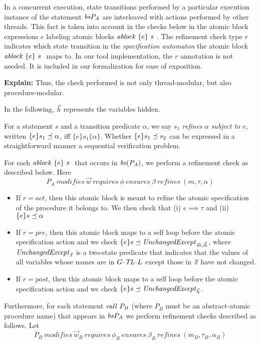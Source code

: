 
In a concurrent execution, state transitions performed by a particular execution instance of the statement $\mathit{bs}{P_{A}}$ are interleaved with actions performed by other threads. This fact is taken into account in the checks below in the atomic block expressions $e$ labeling atomic blocks $\mathit{ablock}\ {\{e\}}\ {s}\ $. The refinement check type $r$ indicates which state transition in the {\em specification automaton} the atomic block $\mathit{ablock}\ {\{e\}}\ {s}\ $ maps to. In our tool implementation, the $r$ annotation is not needed. It is included in our formalization for ease of exposition. 


{\bf Explain:} Thus, the check performed is not only thread-modular, but also procedure-modular. 

In the following, $\vec{h}$ represents the variables hidden.

For a statement $s$ and a transition predicate $\alpha$, we say $s_1$ {\em refines} $\alpha$
{\em subject to $e$}, written $\{ {e} \} {s_1} \preceq {\alpha}$, iff $\{ e \} s_1 \{ \alpha \}$.
Whether $\{ {e} \} {s_1} \preceq {s_2}$ can be
expressed in a straightforward manner a sequential verification
problem.



For each $\mathit{ablock}\ {\{e\}}\ {s}\ $ that occurs in $\mathit{bs}(P_{A})$, we perform a refinement check as described below. Here 
$$P_{A}\ \mathit{modifies}\
\vec{w}\ \mathit{requires}\ \phi\ \mathit{ensures}\ \beta\
\mathit{refines}\ (m, \tau, \alpha)$$
\begin{itemize}
\item If $r = \mathit{act}$, then this atomic block is meant to refine the atomic specification of the procedure it belongs to. We then check that 
(i) $e \implies \tau$ and 
(ii) $\{ {e} \} {s} \preceq {\alpha}$
\item If $r = \mathit{pre}$, then this atomic block maps to a self loop before the atomic specification action and we check $\{ {e} \} {s} \preceq {\mathit{UnchangedExcept}_{ {{ \vec{\mathit{w}}\cup \vec{h}}} }}$, where $\mathit{UnchangedExcept}_{ {\vec{\mathit{x}}} }$ is a two-state predicate that indicates that the values of all variables whose names are in $G\!\cdot\!\mathit{TL}\!\cdot\!L$ except those in $\vec{\mathit{x}}$ have not changed. 
\item If $r = \mathit{post}$, then this atomic block maps to a self loop before the atomic specification action and we check $\{ {e} \} {s} \preceq {\mathit{UnchangedExcept}_{ {{ \vec{h}}} }}$. 
\end{itemize}
Furthermore, for each statement $\mathit{call}\ P_{B}$ (where $P_{B}$ must be an abstract-atomic procedure name) that appears in $\mathit{bs}{P_{A}}$ we perform refinement checks described as follows.
Let
$$P_{B}\ \mathit{modifies}\
\vec{w}_{B}\ \mathit{requires}\ \phi_{B}\ \mathit{ensures}\ \beta_{B}\
\mathit{refines}\ (m_{B}, \tau_{B}, \alpha_{B})$$

